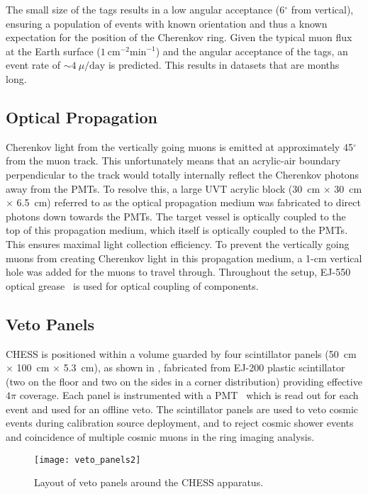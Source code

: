 The small size of the tags results in a low angular acceptance (6$^{\circ}$ from vertical), ensuring a population of events with known orientation and thus a known expectation for the position of the Cherenkov ring.  
Given the typical muon flux at the Earth surface ($1~\mbox{cm}^{-2}\mbox{min}^{-1}$) and the angular acceptance of the tags, an event rate of $\sim4~\mu / \mbox{day}$ is predicted.
This results in datasets that are months long.

\subsection{Optical Propagation}

Cherenkov light from the vertically going muons is emitted at approximately 45$^{\circ}$from the muon track.
This unfortunately means that an acrylic-air boundary perpendicular to the track would totally internally reflect the Cherenkov photons away from the PMTs.
To resolve this, a large UVT acrylic block (30~cm $\times$ 30~cm $\times$ 6.5~cm) referred to as the optical propagation medium was fabricated to direct photons down towards the PMTs.
The target vessel is optically coupled to the top of this propagation medium, which itself is optically coupled to the PMTs.
This ensures maximal light collection efficiency.
To prevent the vertically going muons from creating Cherenkov light in this propagation medium, a 1-cm vertical hole was added for the muons to travel through.
Throughout the setup, EJ-550 optical grease~\cite{ej550} is used for optical coupling of components. 

\subsection{Veto Panels}\label{s:veto}

CHESS is positioned within a volume guarded by four scintillator panels (50~cm $\times$ 100~cm $\times$ 5.3~cm), as shown in , fabricated from EJ-200 plastic scintillator~\cite{ej200} (two on the floor and two on the sides in a corner distribution) providing effective $4\pi$ coverage. 
Each panel is instrumented with a PMT~\cite{9102ksb} which is read out for each event and used for an offline veto. The scintillator panels are used to veto cosmic events during calibration source deployment, and to reject cosmic shower events and coincidence of multiple cosmic muons in the ring imaging analysis. 

\begin{figure}
\centering
\texttt{[image: veto\_panels2]}
\caption{Layout of veto panels around the CHESS apparatus. }
\label{f:veto}
\end{figure}


